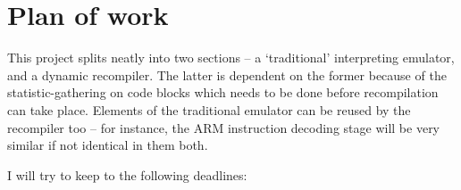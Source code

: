 \section*{Plan of work}

This project splits neatly into two sections -- a `traditional' interpreting emulator, and a dynamic recompiler. The latter is dependent on the former because of the statistic-gathering on code blocks which needs to be done before recompilation can take place. Elements of the traditional emulator can be reused by the recompiler too -- for instance, the ARM instruction decoding stage will be very similar if not identical in them both.

I will try to keep to the following deadlines:

